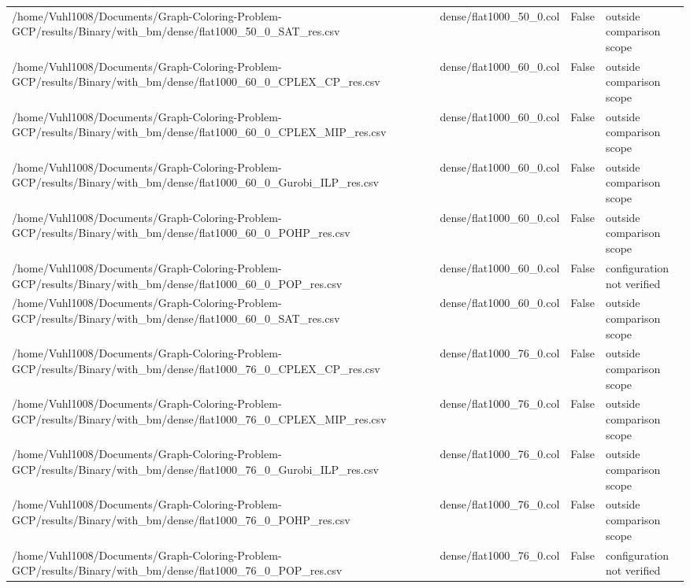 \begin{table}[htbp]
\begin{tabular}{llll}
/home/Vuhl1008/Documents/Graph-Coloring-Problem-GCP/results/Binary/with\_bm/dense/flat1000\_50\_0\_SAT\_res.csv & dense/flat1000\_50\_0.col & False & outside comparison scope \\
/home/Vuhl1008/Documents/Graph-Coloring-Problem-GCP/results/Binary/with\_bm/dense/flat1000\_60\_0\_CPLEX\_CP\_res.csv & dense/flat1000\_60\_0.col & False & outside comparison scope \\
/home/Vuhl1008/Documents/Graph-Coloring-Problem-GCP/results/Binary/with\_bm/dense/flat1000\_60\_0\_CPLEX\_MIP\_res.csv & dense/flat1000\_60\_0.col & False & outside comparison scope \\
/home/Vuhl1008/Documents/Graph-Coloring-Problem-GCP/results/Binary/with\_bm/dense/flat1000\_60\_0\_Gurobi\_ILP\_res.csv & dense/flat1000\_60\_0.col & False & outside comparison scope \\
/home/Vuhl1008/Documents/Graph-Coloring-Problem-GCP/results/Binary/with\_bm/dense/flat1000\_60\_0\_POHP\_res.csv & dense/flat1000\_60\_0.col & False & outside comparison scope \\
/home/Vuhl1008/Documents/Graph-Coloring-Problem-GCP/results/Binary/with\_bm/dense/flat1000\_60\_0\_POP\_res.csv & dense/flat1000\_60\_0.col & False & configuration not verified \\
/home/Vuhl1008/Documents/Graph-Coloring-Problem-GCP/results/Binary/with\_bm/dense/flat1000\_60\_0\_SAT\_res.csv & dense/flat1000\_60\_0.col & False & outside comparison scope \\
/home/Vuhl1008/Documents/Graph-Coloring-Problem-GCP/results/Binary/with\_bm/dense/flat1000\_76\_0\_CPLEX\_CP\_res.csv & dense/flat1000\_76\_0.col & False & outside comparison scope \\
/home/Vuhl1008/Documents/Graph-Coloring-Problem-GCP/results/Binary/with\_bm/dense/flat1000\_76\_0\_CPLEX\_MIP\_res.csv & dense/flat1000\_76\_0.col & False & outside comparison scope \\
/home/Vuhl1008/Documents/Graph-Coloring-Problem-GCP/results/Binary/with\_bm/dense/flat1000\_76\_0\_Gurobi\_ILP\_res.csv & dense/flat1000\_76\_0.col & False & outside comparison scope \\
/home/Vuhl1008/Documents/Graph-Coloring-Problem-GCP/results/Binary/with\_bm/dense/flat1000\_76\_0\_POHP\_res.csv & dense/flat1000\_76\_0.col & False & outside comparison scope \\
/home/Vuhl1008/Documents/Graph-Coloring-Problem-GCP/results/Binary/with\_bm/dense/flat1000\_76\_0\_POP\_res.csv & dense/flat1000\_76\_0.col & False & configuration not verified \\

\end{tabular}
\end{table}
